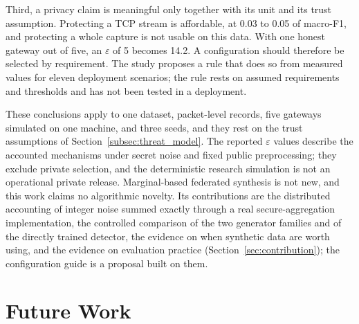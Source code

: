 Third, a privacy claim is meaningful only together with its unit and its trust assumption. Protecting a TCP stream is affordable, at 0.03 to 0.05 of macro-F1, and protecting a whole capture is not usable on this data. With one honest gateway out of five, an $\varepsilon$ of 5 becomes 14.2. A configuration should therefore be selected by requirement. The study proposes a rule that does so from measured values for eleven deployment scenarios; the rule rests on assumed requirements and thresholds and has not been tested in a deployment.

These conclusions apply to one dataset, packet-level records, five gateways simulated on one machine, and three seeds, and they rest on the trust assumptions of Section~\ref{subsec:threat_model}. The reported $\varepsilon$ values describe the accounted mechanisms under secret noise and fixed public preprocessing; they exclude private selection, and the deterministic research simulation is not an operational private release. Marginal-based federated synthesis is not new, and this work claims no algorithmic novelty. Its contributions are the distributed accounting of integer noise summed exactly through a real secure-aggregation implementation, the controlled comparison of the two generator families and of the directly trained detector, the evidence on when synthetic data are worth using, and the evidence on evaluation practice (Section~\ref{sec:contribution}); the configuration guide is a proposal built on them.

\clearpage
\section{Future Work}

